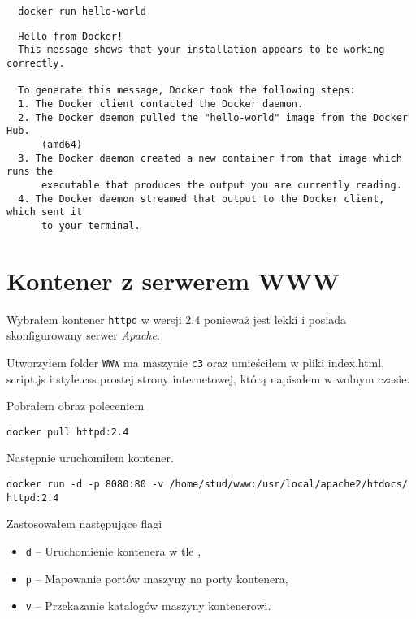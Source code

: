 \documentclass{article} %
\begin{document}
\begin{tcolorbox}[colback=yellow!10!white,colframe=red!45!black,coltitle=yellow!100!black, title=hello-world]
  \begin{lstlisting}
  docker run hello-world
  \end{lstlisting}
  \tcblower
  \scriptsize
  \begin{lstlisting}
  Hello from Docker!
  This message shows that your installation appears to be working correctly.

  To generate this message, Docker took the following steps:
  1. The Docker client contacted the Docker daemon.
  2. The Docker daemon pulled the "hello-world" image from the Docker Hub.
      (amd64)
  3. The Docker daemon created a new container from that image which runs the
      executable that produces the output you are currently reading.
  4. The Docker daemon streamed that output to the Docker client, which sent it
      to your terminal.
  \end{lstlisting}
\end{tcolorbox}
\normalsize

\section{Kontener z serwerem WWW}
Wybrałem kontener \texttt{httpd} w wersji 2.4 ponieważ jest lekki i posiada skonfigurowany serwer \textit{Apache}.

Utworzyłem folder \texttt{WWW} ma maszynie \texttt{c3} oraz umieściłem w pliki index.html, script.js i style.css prostej strony internetowej, którą napisałem w wolnym czasie.

Pobrałem obraz poleceniem
\begin{center}
  \texttt{docker pull httpd:2.4}
\end{center}
Następnie uruchomiłem kontener.
\begin{center}
  \scriptsize
  \texttt{docker run -d -p 8080:80 -v /home/stud/www:/usr/local/apache2/htdocs/ httpd:2.4}
  \normalsize
\end{center}

Zastosowałem następujące flagi
\begin{itemize}
  \item \texttt{d} -- Uruchomienie kontenera w tle ,
  \item \texttt{p} -- Mapowanie portów maszyny na porty kontenera,
  \item \texttt{v} -- Przekazanie katalogów maszyny kontenerowi.
\end{itemize}
\end{document}
